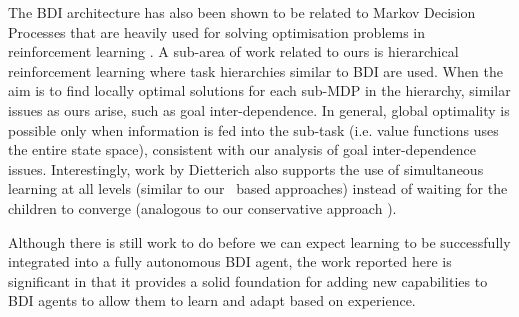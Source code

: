 The BDI architecture has also been shown \cite{simari2006on-th} to be related to Markov Decision Processes that are heavily used for solving optimisation problems in reinforcement learning \cite{Mitchell97:ML}. A sub-area of work related to ours is hierarchical reinforcement learning \cite{barto2003recen} where task hierarchies similar to BDI are used. When the aim is to find locally optimal solutions for each sub-MDP in the hierarchy, similar issues as ours arise, such as goal inter-dependence. In general, global optimality is possible only when information is fed into the sub-task (i.e. value functions uses the entire state space), consistent with our analysis of goal inter-dependence issues. Interestingly, work by Dietterich \cite{dietterich2000hiera} also supports the use of simultaneous learning at all levels (similar to our \CL\ based approaches) instead of waiting for the children to converge (analogous to our conservative  approach \cite{Singh:AAMAS10}).

Although there is still work to do before we can expect learning to be
successfully integrated into a fully autonomous BDI agent, the
work reported here is significant in that it provides a solid
foundation for adding new capabilities to BDI agents to allow them to
learn and adapt based on experience.

